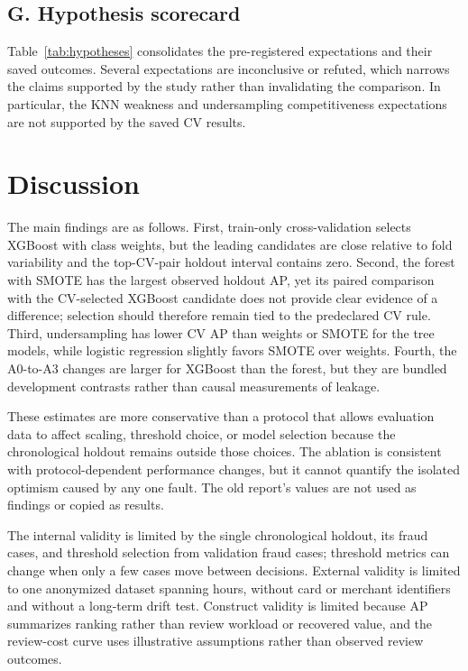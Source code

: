 \documentclass[journal]{IEEEtran}
\begin{document}
\subsection{G. Hypothesis scorecard}
Table~\ref{tab:hypotheses} consolidates the pre-registered expectations and their saved outcomes. Several expectations are inconclusive or refuted, which narrows the claims supported by the study rather than invalidating the comparison. In particular, the KNN weakness and undersampling competitiveness expectations are not supported by the saved CV results.
\begin{table}[!t]
\centering
\caption{Hypothesis outcomes transcribed from the pre-run hypothesis log and its recorded evidence.}
\label{tab:hypotheses}

\end{table}
\FloatBarrier

\section{Discussion}
\label{sec:discussion}
The main findings are as follows. First, train-only cross-validation selects XGBoost with class weights, but the leading candidates are close relative to fold variability and the top-CV-pair holdout interval contains zero. Second, the forest with SMOTE has the largest observed holdout AP, yet its paired comparison with the CV-selected XGBoost candidate does not provide clear evidence of a difference; selection should therefore remain tied to the predeclared CV rule. Third, undersampling has lower CV AP than weights or SMOTE for the tree models, while logistic regression slightly favors SMOTE over weights. Fourth, the A0-to-A3 changes are larger for XGBoost than the forest, but they are bundled development contrasts rather than causal measurements of leakage.

These estimates are more conservative than a protocol that allows evaluation data to affect scaling, threshold choice, or model selection because the chronological holdout remains outside those choices. The ablation is consistent with protocol-dependent performance changes, but it cannot quantify the isolated optimism caused by any one fault. The old report's values are not used as findings or copied as results.

The internal validity is limited by the single chronological holdout, its \TestFraudCount{} fraud cases, and threshold selection from \ValidationFraudCount{} validation fraud cases; threshold metrics can change when only a few cases move between decisions. External validity is limited to one anonymized dataset spanning \TimeSpanHours{} hours, without card or merchant identifiers and without a long-term drift test. Construct validity is limited because AP summarizes ranking rather than review workload or recovered value, and the review-cost curve uses illustrative assumptions rather than observed review outcomes.
\end{document}
